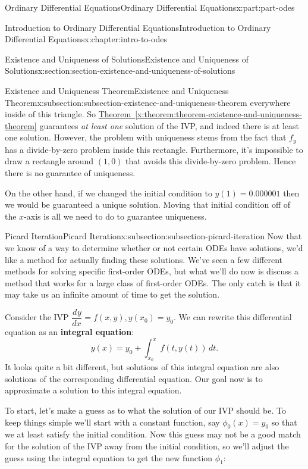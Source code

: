 \documentclass[twoside,10pt,]{book}
\newcommand{\xreffont}{\relax}
\newcommand{\terminology}[1]{\textbf{#1}}
\numberwithin{equation}{part}
\providecommand{\dv}[3][]{\dfrac{d^{#1} #2}{d #3^{#1}}}
\begin{document}
\begin{partptx}{Ordinary Differential Equations}{}{Ordinary Differential Equations}{}{}{x:part:part-odes}
\begin{chapterptx}{Introduction to Ordinary Differential Equations}{}{Introduction to Ordinary Differential Equations}{}{}{x:chapter:intro-to-odes}
\begin{sectionptx}{Existence and Uniqueness of Solutions}{}{Existence and Uniqueness of Solutions}{}{}{x:section:section-existence-and-uniqueness-of-solutions}
\begin{subsectionptx}{Existence and Uniqueness Theorem}{}{Existence and Uniqueness Theorem}{}{}{x:subsection:subsection-existence-and-uniqueness-theorem}
everywhere inside of this triangle. So \hyperref[x:theorem:theorem-existence-and-uniqueness-theorem]{Theorem~{\xreffont\ref{x:theorem:theorem-existence-and-uniqueness-theorem}}} guarantees \emph{at least one} solution of the IVP, and indeed there is at least one solution. However, the problem with uniqueness stems from the fact that \(f_{y}\) has a divide-by-zero problem inside this rectangle. Furthermore, it's impossible to draw a rectangle around \((1,0)\) that avoids this divide-by-zero problem. Hence there is no guarantee of uniqueness.%
\par
On the other hand, if we changed the initial condition to \(y(1) = 0.000001\) then we would be guaranteed a unique solution. Moving that initial condition off of the \(x\)-axis is all we need to do to guarantee uniqueness.%
\end{subsectionptx}
%
%
\typeout{************************************************}
\typeout{************************************************}
%
\begin{subsectionptx}{Picard Iteration}{}{Picard Iteration}{}{}{x:subsection:subsection-picard-iteration}
Now that we know of a way to determine whether or not certain ODEs have solutions, we'd like a method for actually finding these solutions. We've seen a few different methods for solving specific first-order ODEs, but what we'll do now is discuss a method that works for a large class of first-order ODEs. The only catch is that it may take us an infinite amount of time to get the solution.%
\par
Consider the IVP \(\dv{y}{x} = f(x,y), y(x_{0}) = y_{0}\). We can rewrite this differential equation as an \terminology{integral equation}:%
\begin{equation*}
y(x) = y_{0} + \int_{x_{0}}^{x}f(t,y(t))\,dt.
\end{equation*}
It looks quite a bit different, but solutions of this integral equation are also solutions of the corresponding differential equation. Our goal now is to approximate a solution to this integral equation.%
\par
To start, let's make a guess as to what the solution of our IVP should be. To keep things simple we'll start with a constant function, say \(\phi_{0}(x) = y_{0}\) so that we at least satisfy the initial condition. Now this guess may not be a good match for the solution of the IVP away from the initial condition, so we'll adjust the guess using the integral equation to get the new function \(\phi_{1}\):%
\begin{equation*}

\end{equation*}
\end{subsectionptx}
\end{sectionptx}
\end{chapterptx}
\end{partptx}
\end{document}
